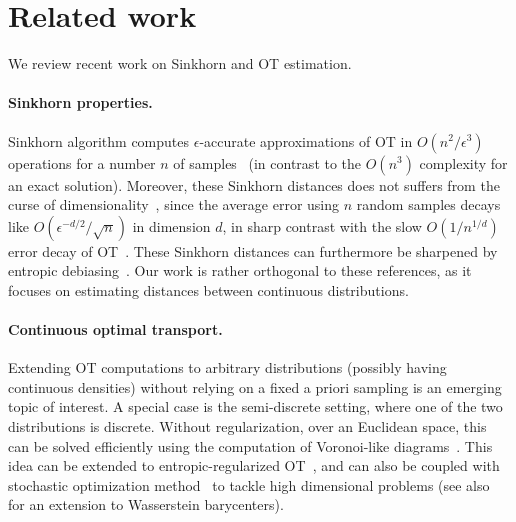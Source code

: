 
\section{Related work}\label{sec:related}

We review recent work on Sinkhorn and OT estimation. 

\paragraph{Sinkhorn properties.} Sinkhorn algorithm computes $\epsilon$-accurate
approximations of OT in $O(n^2/\epsilon^3)$ operations for a number $n$ of
samples~\cite{altschuler2017near} (in contrast to the $O(n^3)$ complexity for an
exact solution). Moreover, these Sinkhorn distances does not suffers from the
curse of dimensionality~\cite{2019-Genevay-aistats}, since the average error
using $n$ random samples decays like $O(\epsilon^{-d/2}/\sqrt{n})$ in dimension
$d$, in sharp contrast with the slow $O(1/n^{1/d})$ error decay of
OT~\cite{weed2019sharp}. These Sinkhorn distances can furthermore be sharpened
by entropic debiasing~\cite{2019-Feydy-aistats}. Our work is rather orthogonal to these references, as it focuses on estimating distances between continuous distributions.

\paragraph{Continuous optimal transport.} Extending OT computations to arbitrary distributions
(possibly having continuous densities) without relying on a fixed a priori
sampling is an emerging topic of interest. A special case is the semi-discrete
setting, where one of the two distributions is discrete. Without regularization,
over an Euclidean space, this can be solved efficiently using the computation of
Voronoi-like diagrams~\cite{merigot2011multiscale}. This idea can be extended to
entropic-regularized OT~\cite{cuturi2018semidual}, and can also be coupled with
stochastic optimization method~\cite{2016-genevay-nips} to tackle high
dimensional problems (see also~\citet{staib2017parallel} for an extension to Wasserstein barycenters). 

